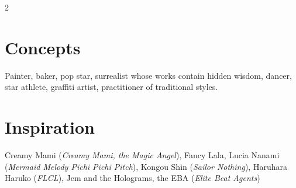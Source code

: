 \begin{multicols}{2}
\section*{Concepts}
Painter, baker, pop star, surrealist whose works contain hidden wisdom, dancer, star athlete, graffiti artist, practitioner of traditional styles. 

\section*{Inspiration}

Creamy Mami (\textit{Creamy Mami, the Magic Angel}), Fancy Lala, Lucia Nanami (\textit{Mermaid Melody Pichi Pichi Pitch}), Kongou Shin (\textit{Sailor Nothing}), Haruhara Haruko (\textit{FLCL}), Jem and the Holograms, the EBA (\textit{Elite Beat Agents})



\end{multicols}\newpage{}
